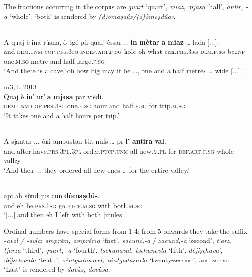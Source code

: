 The fractions occurring in the corpus are \textit{quart} `quart', \textit{miaz}, \textit{mjasa} ‘half’, \textit{antir, -a} ‘whole’; `both' is rendered by \textit{(d)òmaṣdús/(d)òmaṣdúas}.

\ea
{}\\
\gll A quaj è ina rùsna, ò tgé pù qual' èssar … \textbf{in} \textbf{mètar} \textbf{a} \textbf{miaz} … lada [...].\\
and \textsc{dem.unm} \textsc{cop.prs.3sg} \textsc{indef.art.f.sg} hole oh what  can.\textsc{prs.3sg} \textsc{dem.f.sg} be.\textsc{inf} {} one.\textsc{m.sg} metre and half {} large.\textsc{f.sg}\\
\glt `And there is a cave, oh how big may it be …, one and a half metres … wide [...].'
\z

\ea

 {m3, l. 2013}\\
	\gll Quaj è \textbf{in}’ ur’ \textbf{a} \textbf{mjasa} par vièdi.  \\
\textsc{dem.unm} \textsc{cop.prs.3sg} one.\textsc{f.sg} hour and half.\textsc{f.sg} for trip.\textsc{m.sg}\\
\glt `It takes one and a half hours per trip.'
\z

\ea

\\
\gll  A sjantar ... òni ampustau tùt nùfs … pr \textbf{l’} \textbf{antira} \textbf{val}.  \\
and after {} have.\textsc{prs.3pl.3pl} order.\textsc{ptcp.unm} all new.\textsc{m.pl} {} for \textsc{def.art.f.sg} whole valley \\
\glt `And then ... they ordered all new ones … for the entire valley.'
\z

\ea
{}\\
\gll  [...] api ah sùnd jus cun \textbf{dòmaṣdús}.  \\
{} and eh be.\textsc{prs.1sg} go.\textsc{ptcp.m.sg} with both.\textsc{m.sg} \\
\glt `[...] and then eh I left with both [mules].'
\z

Ordinal numbers have special forms from 1-4; from 5 onwards they take the suffix \textit{-aval /  -avla}: \textit{amprém, ampréma} `first', \textit{sacund,-a} / \textit{zacund,-a} `second', \textit{tiarz, tjarza} `third', \textit{quart, -a} `fourth', \textit{tschunaval, tschunavla}  `fifth', \textit{déjiṣchaval, déjṣcha-vla} `tenth', \textit{ véntgaduṣavel, véntgaduṣavla} `twenty-second', and so on. `Last' is rendered by \textit{davùs, davùsa}.

